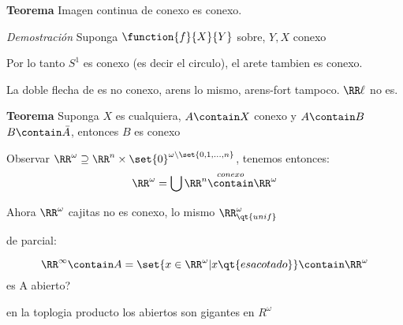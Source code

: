 \textbf{Teorema} Imagen continua de conexo es conexo.

\textit{Demostración} Suponga $ \function{f}{X}{Y} $ sobre, $ Y,X $ conexo

Por lo tanto $ S^1 $ es conexo (es decir el circulo), el arete tambien es conexo.

La doble flecha de es no conexo, arens lo mismo, arens-fort tampoco. $ \RR\ell $ no es. 

\textbf{Teorema} Suponga $X$ es cualquiera, $ A \contain X $ conexo y $ A \contain B$ $B \contain \bar{A} $, entonces $ B $ es conexo

Observar $ \RR^\omega \supseteq \RR^{n} \times \set{0}^{\omega \backslash \set{0,1, \ldots,n}} $, tenemos entonces:
\[ \RR^{\omega} = \bigcup\RR^n \overset{conexo }{\contain} \RR^{\omega} \]

Ahora $ \RR^{\omega} $ cajitas no es conexo, lo mismo $ \RR^{\omega}_{\qt{unif}} $

de parcial:

\[ \RR^{\infty} \contain A = \set{x \in \RR^{\omega} | x \qt{ es acotado }} \contain \RR^{\omega} \]
es A abierto?

en la toplogia producto los abiertos son gigantes en $ R^{\omega} $



